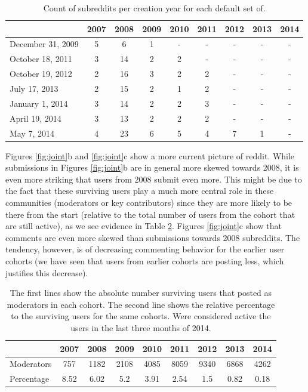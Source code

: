 \begin{table}[!tb]
\centering
\tabcolsep=0.11cm
\singlespacing
\fontsize{7pt}{8pt}\selectfont
\begin{tabular}{|>{\raggedright\centering\arraybackslash}m{1.5cm}|c|c|c|c|c|c|c|c|}
\hline
 & 2007 & 2008 & 2009 & 2010 & 2011 & 2012 & 2013 & 2014 \\ \hline
December 31, 2009 & 5 & 6 & 1 & - & - & - & - & - \\ \hline
October 18, 2011 & 3 & 14 & 2 & 2 & - & - & - & - \\ \hline
October 19, 2012 & 2 & 16 & 3 & 2 & 2 & - & - & - \\ \hline
July 17, 2013 & 2 & 15 & 2 & 1 & 2 & - & - & - \\ \hline
January 1, 2014 & 3 & 14 & 2 & 2 & 3 & - & - & - \\ \hline
April 19, 2014 & 3 & 13 & 2 & 2 & 2 & - & - & - \\ \hline
May 7, 2014 & 4 & 23 & 6 & 5 & 4 & 7 & 1 & - \\ \hline
\end{tabular}
\caption{Count of subreddits per creation year for each default set of.}
\label{tab:defaults}
\end{table}

Figures \ref{fig:joint}b and \ref{fig:joint}c show a more current picture of reddit. While submissions in Figures \ref{fig:joint}b are in general more skewed towards 2008, it is even more striking that users from 2008 submit even more. This might be due to the fact that these surviving users play a much more central role in these communities (moderators or key contributors) since they are more likely to be there from the start (relative to the total number of users from the cohort that are still active), as we see evidence in Table \ref{tab:mods}. Figures \ref{fig:joint}c show that comments are even more skewed than submissions towards 2008 subreddits. The tendency, however, is of decreasing commenting behavior for the earlier user cohorts (we have seen that users from earlier cohorts are posting less, which justifies this decrease).

\begin{table}[!tb]
\centering
\tabcolsep=0.11cm
\singlespacing
\fontsize{7pt}{8pt}\selectfont
\begin{tabular}{|l|c|c|c|c|c|c|c|c|}
\hline
 & 2007 & 2008 & 2009 & 2010 & 2011 & 2012 & 2013 & 2014 \\ \hline
Moderators & 757 & 1182 & 2108 & 4085 & 8059 & 9340 & 6868 & 4262 \\ \hline
Percentage & 8.52 & 6.02 & 5.2 & 3.91 & 2.54 & 1.5 & 0.82 & 0.18 \\ \hline
\end{tabular}
\caption{The first lines show the absolute number surviving users that posted as moderators in each cohort. The second line shows the relative percentage to the surviving users for the same cohorts. Were considered active the users in the last three months of 2014.}
\label{tab:mods}
\end{table}
